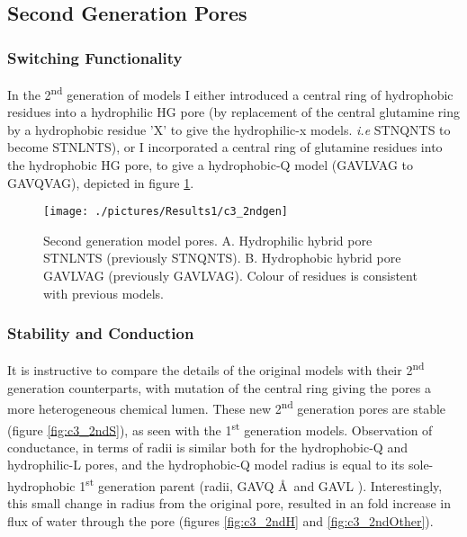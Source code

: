\subsection{Second Generation Pores}

\subsubsection*{Switching Functionality}

In the 2\textsuperscript{nd} generation of models I either introduced a central ring of hydrophobic residues into a hydrophilic HG pore (by replacement of the central glutamine ring by a hydrophobic residue 'X' to give the hydrophilic-x models. \textit{i.e} STNQNTS to become STNLNTS), or I incorporated a central ring of glutamine residues into the hydrophobic HG pore, to give a hydrophobic-Q model (GAVLVAG to GAVQVAG), depicted in figure \ref{fig:c3_2ndgen}. 

\begin{figure}[H]
\begin{center}
\texttt{[image: ./pictures/Results1/c3\_2ndgen]}
\caption[Second generation model pores.] {Second generation model pores. A. Hydrophilic hybrid pore STNLNTS (previously STNQNTS). B. Hydrophobic hybrid pore GAVLVAG (previously GAVLVAG). Colour of residues is consistent with previous models.}
\label{fig:c3_2ndgen}
\end{center}
\end{figure}

\subsubsection*{Stability and Conduction}

It is instructive to compare the details of the original models with their 2\textsuperscript{nd} generation counterparts, with mutation of the central ring giving the pores a more heterogeneous chemical lumen. These new 2\textsuperscript{nd} generation pores are stable (figure \ref{fig:c3_2ndS}), as seen with the 1\textsuperscript{st} generation models. Observation of conductance, in terms of radii is similar both for the hydrophobic-Q and hydrophilic-L pores, and the hydrophobic-Q model radius is equal to its sole-hydrophobic 1\textsuperscript{st} generation parent (radii, GAVQ  \AA\ and GAVL  \angstrom). Interestingly, this small change in radius from the original pore, resulted in an  fold increase in flux of water through the pore (figures \ref{fig:c3_2ndH} and \ref{fig:c3_2ndOther}). 

